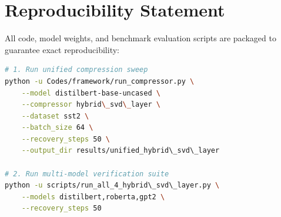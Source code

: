 \section{Reproducibility Statement}
All code, model weights, and benchmark evaluation scripts are packaged to guarantee exact reproducibility:
\begin{lstlisting}[language=bash]
# 1. Run unified compression sweep
python -u Codes/framework/run_compressor.py \
    --model distilbert-base-uncased \
    --compressor hybrid\_svd\_layer \
    --dataset sst2 \
    --batch_size 64 \
    --recovery_steps 50 \
    --output_dir results/unified_hybrid\_svd\_layer

# 2. Run multi-model verification suite
python -u scripts/run_all_4_hybrid\_svd\_layer.py \
    --models distilbert,roberta,gpt2 \
    --recovery_steps 50
\end{lstlisting}
